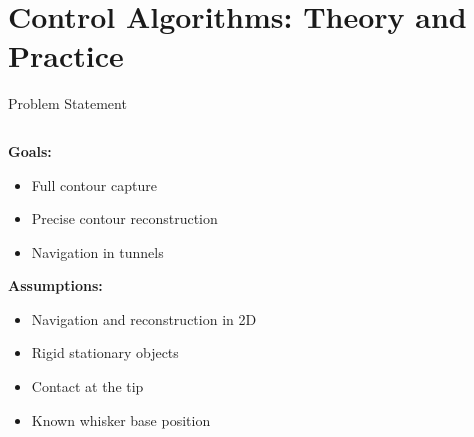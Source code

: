 \documentclass[AIRbeamer
,optEnglish
,optBiber
,optBibstyleAlphabetic
,optBeamerClassicFormat%
]{AIRlatex}
\begin{document}
    \section{Control Algorithms: Theory and Practice}

    \begin{frame}{Problem Statement}
        \begin{columns}[T,onlytextwidth]
            \begin{column}[T]{0.4\textwidth}
                \textbf{Goals:}
                \begin{itemize}
                    \item Full contour capture
                    \item Precise contour reconstruction
                    \item Navigation in tunnels
                \end{itemize}
                \textbf{Assumptions:}
                \begin{itemize}
                    \item Navigation and reconstruction in 2D
                    \item Rigid stationary objects
                    \item Contact at the tip
                    \item Known whisker base position
                \end{itemize}
            \end{column}
        \end{columns}
    \end{frame}
\end{document}
